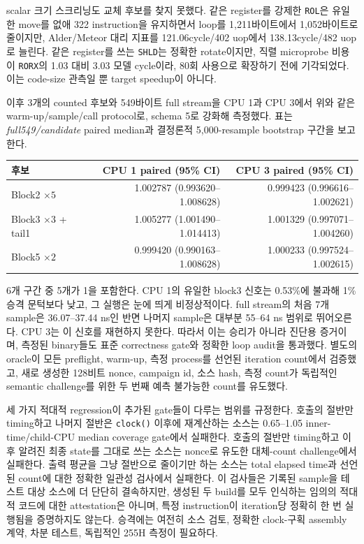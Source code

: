 \documentclass[11pt,a4paper]{article}
\begin{document}
scalar 크기 스크리닝도 교체 후보를 찾지 못했다.  같은
register를 강제한 \texttt{ROL}은 유일한 move를 없애 322 instruction을
유지하면서 loop를 1,211바이트에서 1,052바이트로 줄이지만, Alder/Meteor
대리 지표를 121.06cycle/402 uop에서 138.13cycle/482 uop로 늘린다.
같은 register를 쓰는 \texttt{SHLD}는 정확한 rotate이지만, 직렬
microprobe 비용이 \texttt{RORX}의 1.03 대비 3.03 모델 cycle이라, 80회
사용으로 확장하기 전에 기각되었다.  이는 code-size 관측일 뿐 target
speedup이 아니다.

이후 3개의 counted 후보와 549바이트 full stream을 CPU 1과 CPU 3에서
위와 같은 warm-up/sample/call protocol로, schema 5로 강화해 측정했다.
표는 \emph{full549/candidate} paired median과 결정론적 5,000-resample
bootstrap 구간을 보고한다.

\begin{center}
\small
\begin{tabular}{lrr}
\toprule
후보 & CPU 1 paired (95\% CI) & CPU 3 paired (95\% CI) \\
\midrule
Block2 $\times 5$ & 1.002787 (0.993620--1.008628) & 0.999423 (0.996616--1.002621) \\
Block3 $\times 3$ + tail1 & 1.005277 (1.001490--1.014413) & 1.001329 (0.997071--1.004260) \\
Block5 $\times 2$ & 0.999420 (0.990163--1.008628) & 1.000233 (0.997524--1.002615) \\
\bottomrule
\end{tabular}
\end{center}

6개 구간 중 5개가 1을 포함한다.  CPU 1의 유일한 block3 신호는 0.53\%에
불과해 1\% 승격 문턱보다 낮고, 그 실행은 눈에 띄게 비정상적이다. full
stream의 처음 7개 sample은 36.07--37.44 ns인 반면 나머지 sample은
대부분 55--64 ns 범위로 뛰어오른다.  CPU 3는 이 신호를 재현하지 못한다.
따라서 이는 승리가 아니라 진단용 증거이며, 측정된 binary들도 표준
correctness gate와 정확한 loop audit을 통과했다.  별도의 oracle이 모든
preflight, warm-up, 측정 process를 선언된 iteration count에서 검증했고,
새로 생성한 128비트 nonce, campaign id, 소스 hash, 측정 count가
독립적인 semantic challenge를 위한 두 번째 예측 불가능한 count를
유도했다.

세 가지 적대적 regression이 추가된 gate들이 다루는 범위를 규정한다.
호출의 절반만 timing하고 나머지 절반은 \texttt{clock()} 이후에
재계산하는 소스는 0.65--1.05 inner-time/child-CPU median coverage
gate에서 실패한다.  호출의 절반만 timing하고 이후 알려진 최종 state를
그대로 쓰는 소스는 nonce로 유도한 대체-count challenge에서 실패한다.
출력 평균을 그냥 절반으로 줄이기만 하는 소스는 total elapsed time과
선언된 count에 대한 정확한 일관성 검사에서 실패한다.  이 검사들은
기록된 sample을 테스트 대상 소스에 더 단단히 결속하지만, 생성된 두
build를 모두 인식하는 임의의 적대적 코드에 대한 attestation은 아니며,
특정 instruction이 iteration당 정확히 한 번 실행됨을 증명하지도
않는다.  승격에는 여전히 소스 검토, 정확한 clock-구획 assembly 계약,
차분 테스트, 독립적인 255H 측정이 필요하다.
\end{document}
